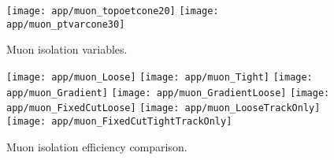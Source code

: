 \begin{figure}
\texttt{[image: app/muon\_topoetcone20]}
\texttt{[image: app/muon\_ptvarcone30]}
\caption{Muon isolation variables.}
\label{fig_muon_isovar}
\end{figure}

\begin{figure}
\texttt{[image: app/muon\_Loose]}
\texttt{[image: app/muon\_Tight]}
\texttt{[image: app/muon\_Gradient]}
\texttt{[image: app/muon\_GradientLoose]}
\texttt{[image: app/muon\_FixedCutLoose]}
\texttt{[image: app/muon\_LooseTrackOnly]}
\texttt{[image: app/muon\_FixedCutTightTrackOnly]}
\caption{Muon isolation efficiency comparison.}
\label{fig_muon_isoeff}
\end{figure}


